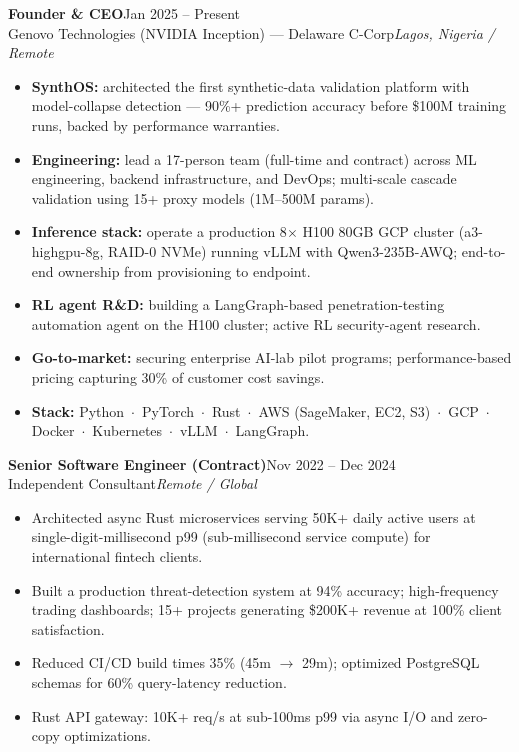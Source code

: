 \documentclass[10pt,a4paper]{article}
\newcommand{\sep}{\ $\cdot$\ }
\newcommand{\role}[4]{%
  \vspace{2pt}%
  {\bfseries #1}\hfill{\color{muted}#3}\\[1pt]%
  {\color{accent}#2}\hfill{\color{muted}\itshape #4}\par%
  \vspace{2pt}%
}
\begin{document}
\role{Founder \& CEO}{Genovo Technologies (NVIDIA Inception) --- Delaware C-Corp}{Jan 2025 -- Present}{Lagos, Nigeria / Remote}
\begin{itemize}
  \item \textbf{SynthOS:} architected the first synthetic-data validation platform with model-collapse
        detection --- 90\%+ prediction accuracy before \$100M training runs, backed by performance warranties.
  \item \textbf{Engineering:} lead a 17-person team (full-time and contract) across ML engineering, backend
        infrastructure, and DevOps; multi-scale cascade validation using 15+ proxy models (1M--500M params).
  \item \textbf{Inference stack:} operate a production 8$\times$ H100 80GB GCP cluster (a3-highgpu-8g, RAID-0 NVMe)
        running vLLM with Qwen3-235B-AWQ; end-to-end ownership from provisioning to endpoint.
  \item \textbf{RL agent R\&D:} building a LangGraph-based penetration-testing automation agent on the H100
        cluster; active RL security-agent research.
  \item \textbf{Go-to-market:} securing enterprise AI-lab pilot programs; performance-based pricing capturing
        30\% of customer cost savings.
  \item \textbf{Stack:} Python\sep PyTorch\sep Rust\sep AWS (SageMaker, EC2, S3)\sep GCP\sep
        Docker\sep Kubernetes\sep vLLM\sep LangGraph.
\end{itemize}

\role{Senior Software Engineer (Contract)}{Independent Consultant}{Nov 2022 -- Dec 2024}{Remote / Global}
\begin{itemize}
  \item Architected async Rust microservices serving 50K+ daily active users at single-digit-millisecond p99
        (sub-millisecond service compute) for international fintech clients.
  \item Built a production threat-detection system at 94\% accuracy; high-frequency trading dashboards;
        15+ projects generating \$200K+ revenue at 100\% client satisfaction.
  \item Reduced CI/CD build times 35\% (45m $\rightarrow$ 29m); optimized PostgreSQL schemas for 60\% query-latency reduction.
  \item Rust API gateway: 10K+ req/s at sub-100ms p99 via async I/O and zero-copy optimizations.
\end{itemize}
\end{document}
